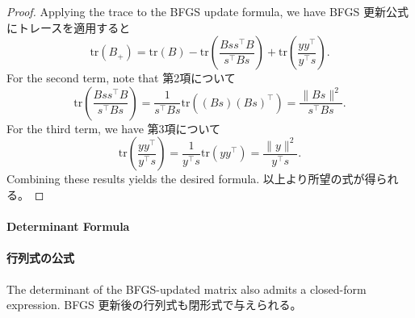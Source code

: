 \documentclass[0_main]{subfiles}
\begin{document}
\begin{proof}
    \ifEn
        Applying the trace to the BFGS update formula, we have
    \else
        BFGS 更新公式にトレースを適用すると
    \fi
    \begin{equation*}
        \mathrm{tr}(B_{+}) = \mathrm{tr}(B) - \mathrm{tr}\left(\frac{Bss^\top B}{s^\top Bs}\right) + \mathrm{tr}\left(\frac{yy^\top}{y^\top s}\right).
    \end{equation*}
    \ifEn
        For the second term, note that
    \else
        第2項について
    \fi
    \begin{equation*}
        \mathrm{tr}\left(\frac{Bss^\top B}{s^\top Bs}\right) = \frac{1}{s^\top Bs}\mathrm{tr}((Bs)(Bs)^\top) = \frac{\lVert B s \rVert^2}{s^\top Bs}.
    \end{equation*}
    \ifEn
        For the third term, we have
    \else
        第3項について
    \fi
    \begin{equation*}
        \mathrm{tr}\left(\frac{yy^\top}{y^\top s}\right) = \frac{1}{y^\top s}\mathrm{tr}(yy^\top) = \frac{\lVert y \rVert^2}{y^\top s}.
    \end{equation*}
    \ifEn
        Combining these results yields the desired formula.
    \else
        以上より所望の式が得られる。
    \fi
    \myQED
\end{proof}

\ifEn
    \paragraph{Determinant Formula}
\else
    \paragraph{行列式の公式}
\fi

\ifEn
    The determinant of the BFGS-updated matrix also admits a closed-form expression.
\else
    BFGS 更新後の行列式も閉形式で与えられる。
\fi
\end{document}
